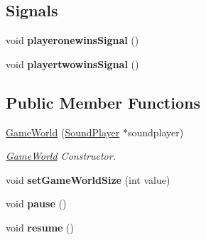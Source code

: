\subsection*{Signals}
\begin{DoxyCompactItemize}
\item 
void {\bfseries playeronewins\+Signal} ()\hypertarget{class_game_world_a0914e98a89dce739b88998a22e27b74d}{}\label{class_game_world_a0914e98a89dce739b88998a22e27b74d}

\item 
void {\bfseries playertwowins\+Signal} ()\hypertarget{class_game_world_aa0bed12706f43c5efceeaf81a08a5750}{}\label{class_game_world_aa0bed12706f43c5efceeaf81a08a5750}

\end{DoxyCompactItemize}
\subsection*{Public Member Functions}
\begin{DoxyCompactItemize}
\item 
\hyperlink{class_game_world_a4917d80cbe417b0dc1d9023499d83f72}{Game\+World} (\hyperlink{class_sound_player}{Sound\+Player} $\ast$soundplayer)\hypertarget{class_game_world_a4917d80cbe417b0dc1d9023499d83f72}{}\label{class_game_world_a4917d80cbe417b0dc1d9023499d83f72}

\begin{DoxyCompactList}\small\item\em \hyperlink{class_game_world}{Game\+World} Constructor. \end{DoxyCompactList}\item 
void {\bfseries set\+Game\+World\+Size} (int value)\hypertarget{class_game_world_a2a8abffdaba4eee013e9b9d90e33a1ab}{}\label{class_game_world_a2a8abffdaba4eee013e9b9d90e33a1ab}

\item 
void {\bfseries pause} ()\hypertarget{class_game_world_a16bb1b2b833157573cb2a5e7de7a9ea8}{}\label{class_game_world_a16bb1b2b833157573cb2a5e7de7a9ea8}

\item 
void {\bfseries resume} ()\hypertarget{class_game_world_abac3f51224b0a62f23312534d3c642e5}{}\label{class_game_world_abac3f51224b0a62f23312534d3c642e5}

\end{DoxyCompactItemize}
